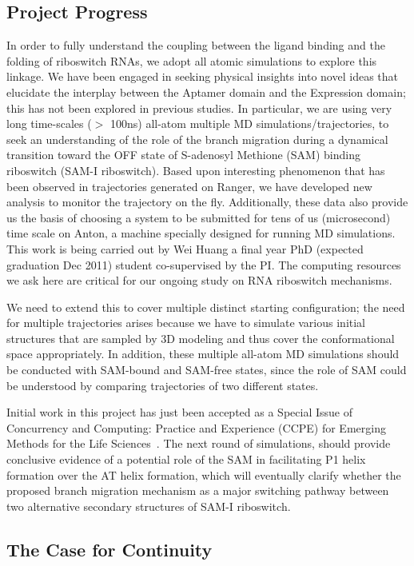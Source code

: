 \documentclass[a4paper,10pt]{article}
\begin{document}
\subsection{Project Progress}
In order to fully understand the coupling between the ligand binding
and the folding of riboswitch RNAs, we adopt all atomic simulations to
explore this linkage.  We have been engaged in seeking physical
insights into novel ideas that elucidate the interplay between the
Aptamer domain and the Expression domain; this has not been explored
in previous studies.  In particular, we are using very long
time-scales ($>$ 100ns) all-atom multiple MD simulations/trajectories,
to seek an understanding of the role of the branch migration during a
dynamical transition toward the OFF state of S-adenosyl Methione (SAM)
binding riboswitch (SAM-I riboswitch).  Based upon interesting
phenomenon that has been observed in trajectories generated on Ranger,
we have developed new analysis to monitor the trajectory on the
fly. Additionally, these data also provide us the basis of choosing a
system to be submitted for tens of us (microsecond) time scale on
Anton, a machine specially designed for running MD simulations. This
work is being carried out by Wei Huang a final year PhD (expected
graduation Dec 2011) student co-supervised by the PI.  The computing
resources we ask here are critical for our ongoing study on RNA
riboswitch mechanisms.

We need to extend this to cover multiple distinct starting
configuration; the need for multiple trajectories arises because we
have to simulate various initial structures that are sampled by 3D
modeling and thus cover the conformational space appropriately.  In
addition, these multiple all-atom MD simulations should be conducted
with SAM-bound and SAM-free states, since the role of SAM could be
understood by comparing trajectories of two different states.  

Initial work in this project has just been accepted as a Special Issue
of Concurrency and Computing: Practice and Experience (CCPE) for
Emerging Methods for the Life Sciences~\cite{ccpe10}.  The next round
of simulations, should provide conclusive evidence of a potential role
of the SAM in facilitating P1 helix formation over the AT helix
formation, which will eventually clarify whether the proposed branch
migration mechanism as a major switching pathway between two
alternative secondary structures of SAM-I riboswitch.

\subsection{The Case for Continuity}
\end{document}
